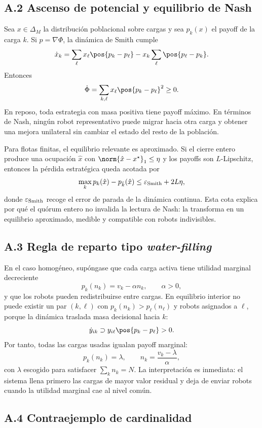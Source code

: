 \subsection*{A.2 Ascenso de potencial y equilibrio de Nash}

Sea $x\in\Delta_M$ la distribución poblacional sobre cargas y sea $p_k(x)$ el payoff de
la carga $k$. Si $p=\nabla\Phi$, la dinámica de Smith cumple
\[
  \dot x_k =
  \sum_{\ell}x_\ell\pos{p_k-p_\ell}
  -x_k\sum_{\ell}\pos{p_\ell-p_k}.
\]
Entonces
\[
  \dot\Phi
  =
  \sum_{k,\ell}x_\ell\pos{p_k-p_\ell}^2\geq 0.
\]
En reposo, toda estrategia con masa positiva tiene payoff máximo. En términos de Nash,
ningún robot representativo puede migrar hacia otra carga y obtener una mejora unilateral
sin cambiar el estado del resto de la población.

Para flotas finitas, el equilibrio relevante es aproximado. Si el cierre entero produce
una ocupación $\hat x$ con $\norm{\hat x-x^\star}_1\leq\eta$ y los payoffs son
$L$-Lipschitz, entonces la pérdida estratégica queda acotada por
\[
  \max_k p_k(\hat x)-p_{\hat k}(\hat x)
  \leq
  \varepsilon_{\rm Smith}+2L\eta,
\]
donde $\varepsilon_{\rm Smith}$ recoge el error de parada de la dinámica continua. Esta
cota explica por qué el quórum entero no invalida la lectura de Nash: la transforma en un
equilibrio aproximado, medible y compatible con robots indivisibles.

\subsection*{A.3 Regla de reparto tipo \emph{water-filling}}

En el caso homogéneo, supóngase que cada carga activa tiene utilidad marginal
decreciente
\[
  p_k(n_k)=v_k-\alpha n_k,\qquad \alpha>0,
\]
y que los robots pueden redistribuirse entre cargas. En equilibrio interior no puede
existir un par $(k,\ell)$ con $p_k(n_k)>p_\ell(n_\ell)$ y robots asignados a $\ell$,
porque la dinámica traslada masa decisional hacia $k$:
\[
  \dot y_{ik} \supset y_{i\ell}\pos{p_k-p_\ell}>0 .
\]
Por tanto, todas las cargas usadas igualan payoff marginal:
\[
  p_k(n_k)=\lambda,\qquad
  n_k=\frac{v_k-\lambda}{\alpha},
\]
con $\lambda$ escogido para satisfacer $\sum_k n_k=N$. La interpretación es inmediata:
el sistema llena primero las cargas de mayor valor residual y deja de enviar robots
cuando la utilidad marginal cae al nivel común.

\subsection*{A.4 Contraejemplo de cardinalidad}

